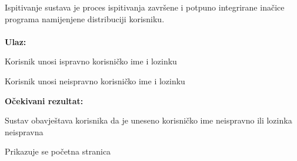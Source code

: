 			 
			
			Ispitivanje sustava je proces ispitivanja završene i potpuno integrirane inačice programa namijenjene distribuciji korisniku.\\
			
			\noindent {}\\
			\textbf{Ulaz: }	
				\begin{packed_enum}
					\item Korisnik unosi ispravno korisničko ime i lozinku
					\item Korisnik unosi neispravno korisničko ime i lozinku
					
				\end{packed_enum}
				
			\noindent \textbf{Očekivani rezultat:}
				
				\begin{packed_enum}
					\item Sustav obavještava korisnika da je uneseno korisničko ime neispravno ili lozinka neispravna
					\item Prikazuje se početna stranica
					
				\end{packed_enum}
				
